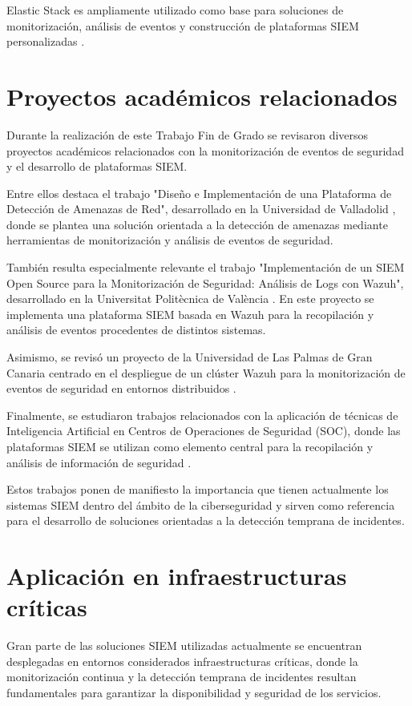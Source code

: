 Elastic Stack es ampliamente utilizado como base para soluciones de monitorización, análisis de eventos y construcción de plataformas SIEM personalizadas \cite{elastic}.

\section{Proyectos académicos relacionados}

Durante la realización de este Trabajo Fin de Grado se revisaron diversos proyectos académicos relacionados con la monitorización de eventos de seguridad y el desarrollo de plataformas SIEM.

Entre ellos destaca el trabajo "Diseño e Implementación de una Plataforma de Detección de Amenazas de Red", desarrollado en la Universidad de Valladolid \cite{valladolid}, donde se plantea una solución orientada a la detección de amenazas mediante herramientas de monitorización y análisis de eventos de seguridad.

También resulta especialmente relevante el trabajo "Implementación de un SIEM Open Source para la Monitorización de Seguridad: Análisis de Logs con Wazuh", desarrollado en la Universitat Politècnica de València \cite{upvsiem}. En este proyecto se implementa una plataforma SIEM basada en Wazuh para la recopilación y análisis de eventos procedentes de distintos sistemas.

Asimismo, se revisó un proyecto de la Universidad de Las Palmas de Gran Canaria centrado en el despliegue de un clúster Wazuh para la monitorización de eventos de seguridad en entornos distribuidos \cite{ulpgcwazuh}.

Finalmente, se estudiaron trabajos relacionados con la aplicación de técnicas de Inteligencia Artificial en Centros de Operaciones de Seguridad (SOC), donde las plataformas SIEM se utilizan como elemento central para la recopilación y análisis de información de seguridad \cite{ia_soc}.

Estos trabajos ponen de manifiesto la importancia que tienen actualmente los sistemas SIEM dentro del ámbito de la ciberseguridad y sirven como referencia para el desarrollo de soluciones orientadas a la detección temprana de incidentes.

\section{Aplicación en infraestructuras críticas}

Gran parte de las soluciones SIEM utilizadas actualmente se encuentran desplegadas en entornos considerados infraestructuras críticas, donde la monitorización continua y la detección temprana de incidentes resultan fundamentales para garantizar la disponibilidad y seguridad de los servicios.

